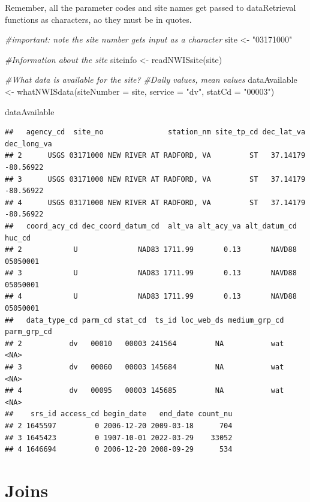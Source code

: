 \documentclass[
]{book}
\newenvironment{Shaded}{\begin{snugshade}}{\end{snugshade}}
\newcommand{\AttributeTok}[1]{\textcolor[rgb]{0.77,0.63,0.00}{#1}}
\newcommand{\CommentTok}[1]{\textcolor[rgb]{0.56,0.35,0.01}{\textit{#1}}}
\newcommand{\FunctionTok}[1]{\textcolor[rgb]{0.00,0.00,0.00}{#1}}
\newcommand{\NormalTok}[1]{#1}
\newcommand{\OtherTok}[1]{\textcolor[rgb]{0.56,0.35,0.01}{#1}}
\newcommand{\StringTok}[1]{\textcolor[rgb]{0.31,0.60,0.02}{#1}}
\begin{document}
Remember, all the parameter codes and site names get passed to dataRetrieval functions as characters, ao they must be in quotes.

\begin{Shaded}
\begin{Highlighting}[]
\CommentTok{\#important: note the site number gets input as a character}
\NormalTok{site }\OtherTok{\textless{}{-}} \StringTok{"03171000"}

\CommentTok{\#Information about the site}
\NormalTok{siteinfo }\OtherTok{\textless{}{-}} \FunctionTok{readNWISsite}\NormalTok{(site)}

\CommentTok{\#What data is available for the site?}
\CommentTok{\#Daily values, mean values}
\NormalTok{dataAvailable }\OtherTok{\textless{}{-}} \FunctionTok{whatNWISdata}\NormalTok{(}\AttributeTok{siteNumber =}\NormalTok{ site, }\AttributeTok{service =} \StringTok{"dv"}\NormalTok{, }\AttributeTok{statCd =} \StringTok{"00003"}\NormalTok{)}

\NormalTok{dataAvailable}
\end{Highlighting}
\end{Shaded}

\begin{verbatim}
##   agency_cd  site_no               station_nm site_tp_cd dec_lat_va dec_long_va
## 2      USGS 03171000 NEW RIVER AT RADFORD, VA         ST   37.14179   -80.56922
## 3      USGS 03171000 NEW RIVER AT RADFORD, VA         ST   37.14179   -80.56922
## 4      USGS 03171000 NEW RIVER AT RADFORD, VA         ST   37.14179   -80.56922
##   coord_acy_cd dec_coord_datum_cd  alt_va alt_acy_va alt_datum_cd   huc_cd
## 2            U              NAD83 1711.99       0.13       NAVD88 05050001
## 3            U              NAD83 1711.99       0.13       NAVD88 05050001
## 4            U              NAD83 1711.99       0.13       NAVD88 05050001
##   data_type_cd parm_cd stat_cd  ts_id loc_web_ds medium_grp_cd parm_grp_cd
## 2           dv   00010   00003 241564         NA           wat        <NA>
## 3           dv   00060   00003 145684         NA           wat        <NA>
## 4           dv   00095   00003 145685         NA           wat        <NA>
##    srs_id access_cd begin_date   end_date count_nu
## 2 1645597         0 2006-12-20 2009-03-18      704
## 3 1645423         0 1907-10-01 2022-03-29    33052
## 4 1646694         0 2006-12-20 2008-09-29      534
\end{verbatim}

\hypertarget{joins}{%
\section{Joins}\label{joins}}
\end{document}
